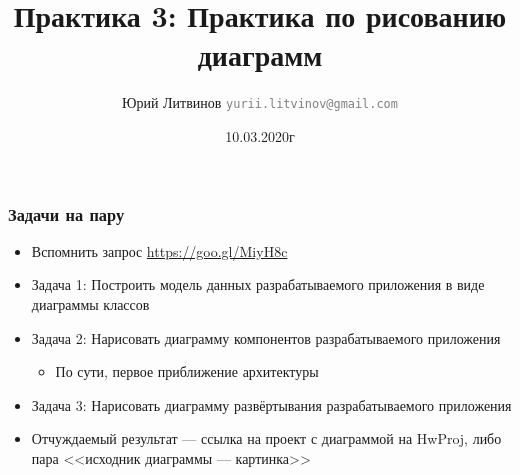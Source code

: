 \documentclass[xetex,mathserif,serif]{beamer}
\title{Практика 3: Практика по рисованию диаграмм}
\author[Юрий Литвинов]{Юрий Литвинов \newline \textcolor{gray}{\small\texttt{yurii.litvinov@gmail.com}}}
\date{10.03.2020г}
\begin{document}
	
	\frame{\titlepage}

	\begin{frame}
		\frametitle{Задачи на пару}
		\begin{itemize}
			\item Вспомнить запрос \url{https://goo.gl/MiyH8c}
			\item Задача 1: Построить модель данных разрабатываемого приложения в виде диаграммы классов
			\item Задача 2: Нарисовать диаграмму компонентов разрабатываемого приложения
			\begin{itemize}
				\item По сути, первое приближение архитектуры
			\end{itemize}
			\item Задача 3: Нарисовать диаграмму развёртывания разрабатываемого приложения
			\item Отчуждаемый результат --- ссылка на проект с диаграммой на HwProj, либо пара <<исходник диаграммы --- картинка>>
		\end{itemize}
	\end{frame}
\end{document}
